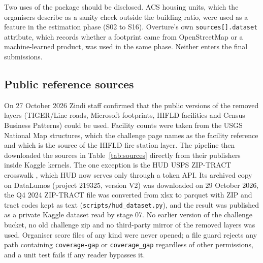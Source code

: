 \documentclass[11pt]{article}
\begin{document}
Two uses of the package should be disclosed. ACS housing units, which the
organisers describe as a sanity check outside the building ratio, were used
as a feature in the estimation phase (S02 to S16). Overture's own
\texttt{sources[].dataset} attribute, which records whether a footprint came
from OpenStreetMap or a machine-learned product, was used in the same phase.
Neither enters the final submissions.

\subsection{Public reference sources}

On 27 October 2026 Zindi staff confirmed that the public versions of the
removed layers (TIGER/Line roads, Microsoft footprints, HIFLD facilities and
Census Business Patterns) could be used. Facility counts were taken from the
USGS National Map structures, which the challenge page names as the facility
reference and which is the source of the HIFLD fire station layer. The pipeline then
downloaded the sources in Table~\ref{tab:sources} directly from their
publishers inside Kaggle kernels. The one exception is the HUD USPS ZIP-TRACT
crosswalk \cite{hud}, which HUD now serves only through a token API. Its
archived copy on DataLumos (project 219325, version V2) was downloaded on 29
October 2026, the Q4 2024 ZIP-TRACT file was converted from xlsx to parquet
with ZIP and tract codes kept as text (\texttt{scripts/hud\_dataset.py}), and
the result was published as a private Kaggle dataset read by stage 07. No
earlier version of the challenge bucket,
no old challenge zip and no third-party mirror of the removed layers was
used. Organiser score files of any kind were never opened; a file guard
rejects any path containing \texttt{coverage-gap} or
\texttt{coverage\_gap} regardless of other permissions, and a unit test fails
if any reader bypasses it.
\end{document}
